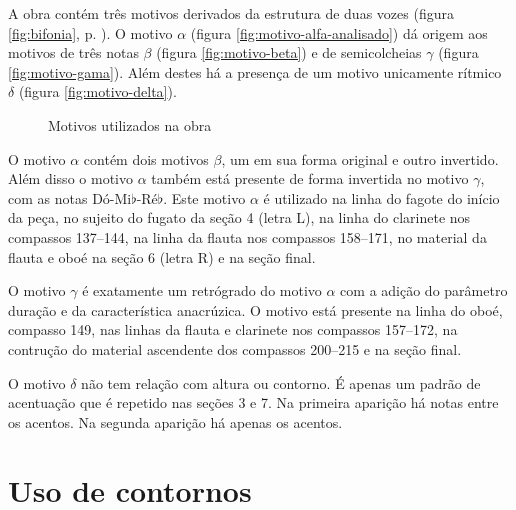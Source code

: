 A obra contém três motivos derivados da estrutura de duas vozes
(figura \ref{fig:bifonia}, p. \pageref{fig:bifonia}). O motivo
$\alpha$ (figura \ref{fig:motivo-alfa-analisado}) dá origem aos
motivos de três notas $\beta$ (figura \ref{fig:motivo-beta}) e de
semicolcheias $\gamma$ (figura \ref{fig:motivo-gama}). Além destes há
a presença de um motivo unicamente rítmico $\delta$ (figura
\ref{fig:motivo-delta}).

\begin{figure}
  \centering


  \caption{Motivos utilizados na obra}
  \label{fig:motivos-utilizados}
\end{figure}

O motivo $\alpha$ contém dois motivos $\beta$, um em sua forma
original e outro invertido. Além disso o motivo $\alpha$ também está
presente de forma invertida no motivo $\gamma$, com as notas
Dó-Mi$\flat$-Ré$\flat$. Este motivo $\alpha$ é utilizado na linha do
fagote do início da peça, no sujeito do fugato da seção 4 (letra L),
na linha do clarinete nos compassos 137--144, na linha da flauta nos
compassos 158--171, no material da flauta e oboé na seção 6 (letra R)
e na seção final.

O motivo $\gamma$ é exatamente um retrógrado do motivo $\alpha$ com a
adição do parâmetro duração e da característica anacrúzica. O motivo
está presente na linha do oboé, compasso 149, nas linhas da flauta e
clarinete nos compassos 157--172, na contrução do material ascendente
dos compassos 200--215 e na seção final.

O motivo $\delta$ não tem relação com altura ou contorno. É apenas um
padrão de acentuação que é repetido nas seções 3 e 7. Na primeira
aparição há notas  entre os acentos. Na segunda aparição
há apenas os acentos.

\section{Uso de contornos}
\label{sec:uso-de-contornos}

